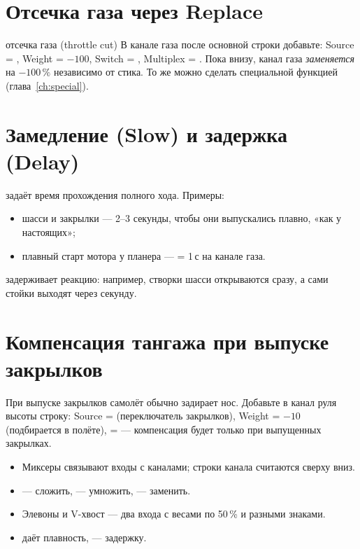 \section{Отсечка газа через Replace}

\begin{recipe}{отсечка газа (throttle cut)}
В канале газа  после основной строки добавьте:
Source = , Weight = $-100$, Switch = , Multiplex = .
Пока  внизу, канал газа \emph{заменяется} на $-100\,\%$ независимо от стика.
То же можно сделать специальной функцией  (глава~\ref{ch:special}).
\end{recipe}

\section{Замедление (Slow) и задержка (Delay)}

 задаёт время прохождения полного хода. Примеры:
\begin{itemize}
  \item шасси и закрылки --- 2--3 секунды, чтобы они выпускались плавно, «как у настоящих»;
  \item плавный старт мотора у планера ---  = 1\,с на канале газа.
\end{itemize}
 задерживает реакцию: например, створки шасси открываются сразу, а сами
стойки выходят через секунду.

\section{Компенсация тангажа при выпуске закрылков}

При выпуске закрылков самолёт обычно задирает нос. Добавьте в канал руля высоты строку:
Source =  (переключатель закрылков), Weight = $-10$ (подбирается в полёте),
 =  --- компенсация будет только при выпущенных закрылках.

\begin{summary}
\begin{itemize}
  \item Миксеры связывают входы с каналами; строки канала считаются сверху вниз.
  \item {} --- сложить,  --- умножить,  --- заменить.
  \item Элевоны и V-хвост --- два входа с весами по 50\,\% и разными знаками.
  \item {} даёт плавность,  --- задержку.
\end{itemize}
\end{summary}
